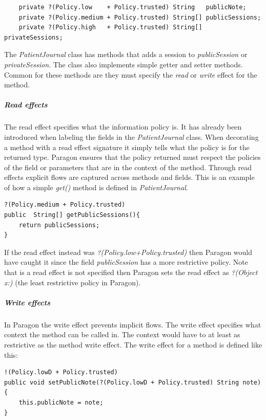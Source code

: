 \begin{lstlisting}
	private ?(Policy.low    + Policy.trusted) String   publicNote;
	private ?(Policy.medium + Policy.trusted) String[] publicSessions;
	private ?(Policy.high   + Policy.trusted) String[] privateSessions;
\end{lstlisting}

The \emph{PatientJournal} class has methods that adds a session to \emph{publicSession} or \emph{privateSession}. The class also implements simple getter and setter methods. Common for these methods are they must specify the \emph{read} or \emph{write} effect for the method.




\subparagraph{Read effects}
The read effect specifies what the information policy is. It has already been introduced when labeling the fields in the \emph{PatientJournal} class. When decorating a method with a read effect signature it simply tells what the policy is for the returned type. Paragon ensures that the policy returned must respect the policies of the field or parameters that are in the context of the method. Through read effects explicit flows are captured across methods and fields. This is an example of how a simple \emph{get()} method is defined in \emph{PatientJournal}.
\begin{lstlisting}
?(Policy.medium + Policy.trusted)
public  String[] getPublicSessions(){
	return publicSessions;
}
\end{lstlisting}

If the read effect instead was \emph{?(Policy.low+Policy.trusted)} then Paragon would have caught it since the field \emph{publicSession} has a more restrictive policy. Note that is a read effect is not specified then Paragon sets the read effect as \emph{?(Object x:)} (the least restrictive policy in Paragon).

\subparagraph{Write effects}
In Paragon the write effect prevents implicit flows. The write effect specifies what context the method can be called in. The context would have to at least as restrictive as the method write effect. The write effect for a method is defined like this:

\begin{lstlisting}
!(Policy.lowD + Policy.trusted) 
public void setPublicNote(?(Policy.lowD + Policy.trusted) String note){
	this.publicNote = note;
}
\end{lstlisting}


